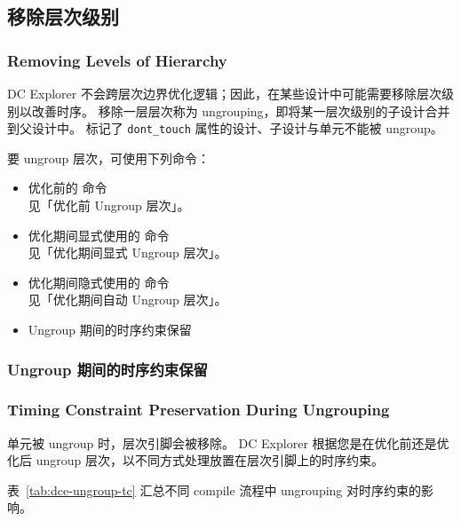 \subsection{移除层次级别}
\subsubsection*{Removing Levels of Hierarchy}

DC Explorer 不会跨层次边界优化逻辑；因此，在某些设计中可能需要移除层次级别以改善时序。
移除一层层次称为 ungrouping，即将某一层次级别的子设计合并到父设计中。
标记了 \texttt{dont\_touch} 属性的设计、子设计与单元不能被 ungroup。

要 ungroup 层次，可使用下列命令：
\begin{itemize}
  \item 优化前的  命令\\
        见「优化前 Ungroup 层次」。
  \item 优化期间显式使用的  命令\\
        见「优化期间显式 Ungroup 层次」。
  \item 优化期间隐式使用的  命令\\
        见「优化期间自动 Ungroup 层次」。
\end{itemize}

\begin{seeAlsoBox}
\begin{itemize}
  \item Ungroup 期间的时序约束保留
\end{itemize}
\end{seeAlsoBox}

\subsubsection{Ungroup 期间的时序约束保留}
\subsubsection*{Timing Constraint Preservation During Ungrouping}

单元被 ungroup 时，层次引脚会被移除。
DC Explorer 根据您是在优化前还是优化后 ungroup 层次，以不同方式处理放置在层次引脚上的时序约束。

表~\ref{tab:dce-ungroup-tc} 汇总不同 compile 流程中 ungrouping 对时序约束的影响。

